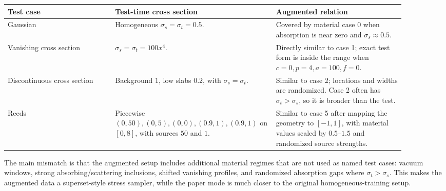 \documentclass[10pt]{article}
\begin{document}
\begin{center}
\begin{tabular}{p{0.25\linewidth} p{0.35\linewidth} p{0.30\linewidth}}
\toprule
Test case & Test-time cross section & Augmented relation \\
\midrule
Gaussian & Homogeneous \(\sigma_s=\sigma_t=0.5\). & Covered by material case 0 when absorption is near zero and \(\sigma_s\approx 0.5\). \\
Vanishing cross section & \(\sigma_s=\sigma_t=100x^4\). & Directly similar to case 1; exact test form is inside the range when \(c=0,p=4,a=100,f=0\). \\
Discontinuous cross section & Background \(1\), low slabs \(0.2\), with \(\sigma_s=\sigma_t\). & Similar to case 2; locations and widths are randomized. Case 2 often has \(\sigma_t>\sigma_s\), so it is broader than the test. \\
Reeds & Piecewise \((0,50),(0,5),(0,0),(0.9,1),(0.9,1)\) on \([0,8]\), with sources \(50\) and \(1\). & Similar to case 5 after mapping the geometry to \([-1,1]\), with material values scaled by \(0.5\)--\(1.5\) and randomized source strengths. \\
\bottomrule
\end{tabular}
\end{center}

The main mismatch is that the augmented setup includes additional material regimes that are not used as named test cases: vacuum windows, strong absorbing/scattering inclusions, shifted vanishing profiles, and randomized absorption gaps where \(\sigma_t>\sigma_s\). This makes the augmented data a superset-style stress sampler, while the paper mode is much closer to the original homogeneous-training setup.
\end{document}
